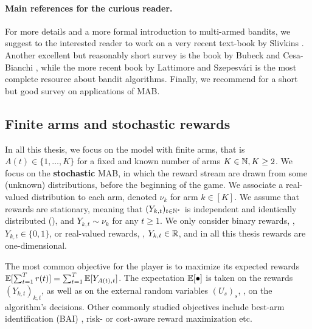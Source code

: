 \paragraph{Main references for the curious reader.}
%
For more details and a more formal introduction to multi-armed bandits, we suggest to the interested reader to work on a very recent text-book by Slivkins \cite{Slivkins2019}.
Another excellent but reasonably short survey is the book by Bubeck and Cesa-Bianchi \cite{Bubeck12}, while the more recent book by Lattimore and Szepesv{\'a}ri \cite{LattimoreBanditAlgorithmsBook} is the most complete resource about bandit algorithms.
Finally, we recommend \cite{bouneffouf2019survey} for a short but good survey on applications of MAB.


\subsection{Finite arms and stochastic rewards}

In all this thesis, we focus on the model with finite arms, that is $A(t)\in\{1,\dots,K\}$ for a fixed and known number of arms $K\in\mathbb{N},K\geq2$.
%
We focus on the \textbf{stochastic} MAB, in which the reward stream are drawn from some (unknown) distributions, before the beginning of the game.
%
%
We associate a real-valued distribution to each arm, denoted $\nu_k$ for arm $k\in[K]$.
We assume that rewards are stationary, meaning that $(Y_{k,t})_{t\in\mathbb{N}^*}$ is independent and identically distributed (\iid), and $Y_{k,t} \sim \nu_k$ for any $t\geq1$.
We only consider binary rewards, \ie, $Y_{k,t}\in\{0,1\}$, or real-valued rewards, \ie, $Y_{k,t}\in\mathbb{R}$, and in all this thesis rewards are one-dimensional.

The most common objective for the player is to maximize its expected rewards $\mathbb{E}[\sum_{t=1}^T r(t)] = \sum_{t=1}^T \mathbb{E}[Y_{A(t),t}]$.
The expectation $\mathbb{E}[\bullet]$ is taken on the rewards $(Y_{k,t})_{k,t}$, as well as on the external random variables $(U_s)_s$, \ie, on the algorithm's decisions.
%
Other commonly studied objectives include best-arm identification (BAI) \cite{audibert2010best}, risk- or cost-aware reward maximization etc.

